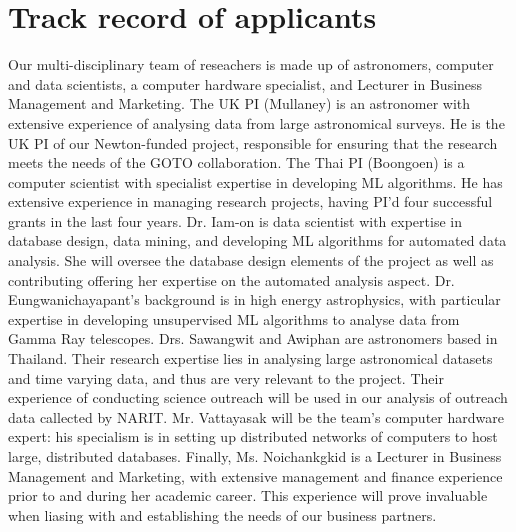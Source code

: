 \documentclass[11pt]{article}
\begin{document}
\section{Track record of applicants}
Our multi-disciplinary team of reseachers is made up of astronomers, computer and data scientists, a computer hardware specialist, and Lecturer in Business Management and Marketing. The UK PI (Mullaney) is an astronomer with extensive experience of analysing data from large astronomical surveys. He is the UK PI of our Newton-funded project, responsible for ensuring that the research meets the needs of the GOTO collaboration. The Thai PI (Boongoen) is a computer scientist with specialist expertise in developing ML algorithms. He has extensive experience in managing research projects, having PI'd four successful grants in the last four years. Dr. Iam-on is data scientist with expertise in database design, data mining, and developing ML algorithms for automated data analysis. She will oversee the database design elements of the project as well as contributing offering her expertise on the automated analysis aspect. Dr. Eungwanichayapant's background is in high energy astrophysics, with particular expertise in developing unsupervised ML algorithms to analyse data from Gamma Ray telescopes. Drs. Sawangwit and Awiphan are astronomers based in Thailand. Their research expertise lies in analysing large astronomical datasets and time varying data, and thus are very relevant to the project. Their experience of conducting science outreach will be used in our analysis of outreach data callected by NARIT. Mr. Vattayasak will be the team's computer hardware expert: his specialism is in setting up distributed networks of computers to host large, distributed databases. Finally, Ms. Noichankgkid is a Lecturer in Business Management and Marketing, with extensive management and finance experience prior to and during her academic career. This experience will prove invaluable when liasing with and establishing the needs of our business partners. 
\end{document}
